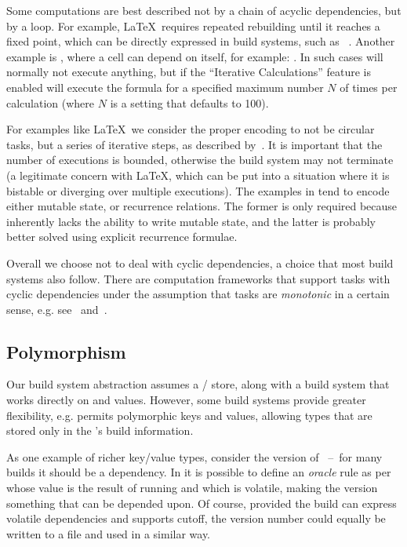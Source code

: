 Some computations are best described not by a chain of acyclic dependencies,
but by a loop. For example, \LaTeX~requires repeated rebuilding until it
reaches a fixed point, which can be directly expressed in build systems, such as
\Pluto~\cite{erdweg2015pluto}. Another example is \Excel, where a cell can
depend on itself, for example: . In such cases \Excel will
normally not execute anything, but if the ``Iterative Calculations'' feature is
enabled will execute the formula for a specified maximum number $N$ of times per
calculation (where $N$ is a setting that defaults to 100).

For examples like \LaTeX~we consider the proper encoding to not be circular
tasks, but a series of iterative steps, as described
by~\citet{shake-fixed-point}. It is important that the number of executions is
bounded, otherwise the build system may not terminate (a legitimate concern
with \LaTeX, which can be put into a situation where it is bistable or diverging
over multiple executions). The examples in \Excel tend to encode either mutable
state, or recurrence relations. The former is only required because \Excel
inherently lacks the ability to write mutable state, and the latter is probably
better solved using explicit recurrence formulae.

Overall we choose not to deal with cyclic dependencies, a choice that most build
systems also follow. There are computation frameworks that support tasks with
cyclic dependencies under the assumption that tasks are \emph{monotonic} in a
certain sense, e.g. see~\cite{pottier2009lazy} and~\cite{radul2009propagation}.

\subsection{Polymorphism}\label{sec-polymorphism}

Our build system abstraction assumes a / store, along with a build
system that works directly on  and  values. However, some build
systems provide greater flexibility, e.g. \Shake permits polymorphic keys and
values, allowing types that are stored only in the \Shake's build information.

As one example of richer key/value types, consider the version of
~--~for many builds it should be a dependency. In \Shake it is possible
to define an \emph{oracle} rule as per~\cite{mitchell2012shake} whose value is
the result of running  and which is volatile, making the
 version something that can be depended upon. Of course, provided the
build can express volatile dependencies and supports cutoff, the version number
could equally be written to a file and used in a similar way.


